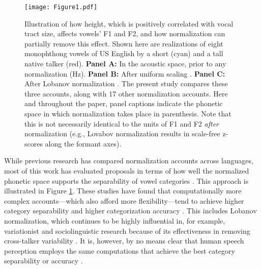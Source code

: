 \documentclass[preprint]{JASA}
\begin{document}
\begin{figure}

{\centering \texttt{[image: Figure1.pdf]} 

}

\caption{Illustration of how height, which is positively correlated with vocal tract size, affects vowels' F1 and F2, and how normalization can partially remove this effect. Shown here are realizations of eight monophthong vowels of US English by a short (cyan) and a tall native talker (red). \textbf{Panel A:} In the acoustic space, prior to any normalization (Hz). \textbf{Panel B:} After uniform scaling \citep{nearey1978}. \textbf{Panel C:} After Lobanov normalization \citep{lobanov1971}. The present study compares these three accounts, along with 17 other normalization accounts. Here and throughout the paper, panel captions indicate the phonetic space in which normalization takes place in parenthesis. Note that this is not necessarily identical to the units of F1 and F2 \emph{after} normalization (e.g., Lovabov normalization results in scale-free z-scores along the formant axes).}\label{fig:Figure1}
\end{figure}

While previous research has compared normalization accounts across languages, most of this work has evaluated proposals in terms of how well the normalized phonetic space supports the separability of vowel categories \citep{adank2004, carpenter-govindarajan1993, cole2010, escudero-bion2007, johnson-sjerps2021, syrdal1985}. This approach is illustrated in Figure \ref{fig:Figure1}. These studies have found that computationally more complex accounts---which also afford more flexibility---tend to achieve higher category separability and higher categorization accuracy \citep[for review, see][]{persson-jaeger2023}. This includes Lobanov normalization, which continues to be highly influential in, for example, variationist and sociolinguistic research because of its effectiveness in removing cross-talker variability \citep[for a critique, see][]{barreda2021}. It is, however, by no means clear that human speech perception employs the same computations that achieve the best category separability or accuracy \citep[see also discussion in][]{barreda2021, nearey-assmann2007}.
\end{document}
